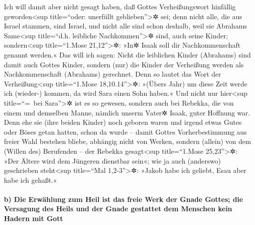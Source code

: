  Ich will damit aber nicht gesagt haben, daß Gottes
Verheißungswort hinfällig geworden\textless sup title=``oder: unerfüllt
geblieben''\textgreater✲ sei; denn nicht alle, die aus Israel stammen,
sind Israel,  und nicht alle sind schon deshalb, weil sie
Abrahams Same\textless sup title=``d.h. leibliche
Nachkommen''\textgreater✲ sind, auch seine Kinder; sondern\textless sup
title=``1.Mose 21,12''\textgreater✲: »In✲ Isaak soll dir
Nachkommenschaft genannt werden.«  Das will ich sagen:
Nicht die leiblichen Kinder (Abrahams) sind damit auch Gottes Kinder,
sondern (nur) die Kinder der Verheißung werden als Nachkommenschaft
(Abrahams) gerechnet.  Denn so lautet das Wort der
Verheißung\textless sup title=``1.Mose 18,10.14''\textgreater✲: »(Übers
Jahr) um diese Zeit werde ich (wieder-) kommen, da wird Sara einen Sohn
haben.«  Und nicht nur hier\textless sup title=``=~bei
Sara''\textgreater✲ ist es so gewesen, sondern auch bei Rebekka, die von
einem und demselben Manne, nämlich unserm Vater✲ Isaak, guter Hoffnung
war.  Denn ehe sie (ihre beiden Kinder) noch geboren
waren und irgend etwas Gutes oder Böses getan hatten, schon da wurde --
damit Gottes Vorherbestimmung aus freier Wahl bestehen bliebe,
 abhängig nicht von Werken, sondern (allein) von dem
(Willen des) Berufenden -- der Rebekka gesagt\textless sup
title=``1.Mose 25,23''\textgreater✲: »Der Ältere wird dem Jüngeren
dienstbar sein«;  wie ja auch (anderswo) geschrieben
steht\textless sup title=``Mal 1,2-3''\textgreater✲: »Jakob habe ich
geliebt, Esau aber habe ich gehaßt.«

\hypertarget{b-die-erwuxe4hlung-zum-heil-ist-das-freie-werk-der-gnade-gottes-die-versagung-des-heils-und-der-gnade-gestattet-dem-menschen-kein-hadern-mit-gott}{%
\paragraph{b) Die Erwählung zum Heil ist das freie Werk der Gnade
Gottes; die Versagung des Heils und der Gnade gestattet dem Menschen
kein Hadern mit
Gott}\label{b-die-erwuxe4hlung-zum-heil-ist-das-freie-werk-der-gnade-gottes-die-versagung-des-heils-und-der-gnade-gestattet-dem-menschen-kein-hadern-mit-gott}}

